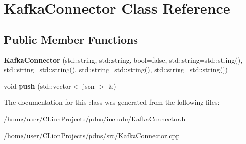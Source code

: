 \hypertarget{classKafkaConnector}{}\section{Kafka\+Connector Class Reference}
\label{classKafkaConnector}
\subsection*{Public Member Functions}
\begin{DoxyCompactItemize}
\item 
\mbox{\label{classKafkaConnector_aac183438275dc4dcd40f24d6bd3a7f47}} 
{\bfseries Kafka\+Connector} (std\+::string, std\+::string, bool=false, std\+::string=std\+::string(), std\+::string=std\+::string(), std\+::string=std\+::string(), std\+::string=std\+::string())
\item 
\mbox{\label{classKafkaConnector_aa3ed5d63f688d31347ed691e86fd40da}} 
void {\bfseries push} (std\+::vector$<$ json $>$ \&)
\end{DoxyCompactItemize}


The documentation for this class was generated from the following files\+:\begin{DoxyCompactItemize}
\item 
/home/user/\+C\+Lion\+Projects/pdns/include/Kafka\+Connector.\+h\item 
/home/user/\+C\+Lion\+Projects/pdns/src/Kafka\+Connector.\+cpp\end{DoxyCompactItemize}
